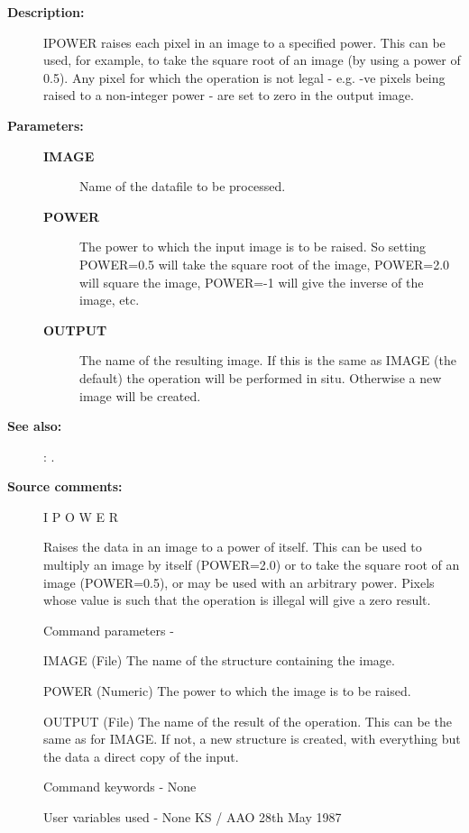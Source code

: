\begin{description}
\begin{description}
\item [\textbf{Description:}]
 IPOWER raises each pixel in an image to a specified power.  This
 can be used, for example, to take the square root of an image (by
 using a power of 0.5).  Any pixel for which the operation is not
 legal - e.g. -ve pixels being raised to a non-integer power - are
 set to zero in the output image.

\item [\textbf{Parameters:}]
\begin{description}
\item [\textbf{IMAGE}]
 Name of the datafile to be processed.
\item [\textbf{POWER}]
 The power to which the input image is to be
 raised.  So setting POWER=0.5 will take the square root
 of the image, POWER=2.0 will square the image, POWER=-1
 will give the inverse of the image, etc.
\item [\textbf{OUTPUT}]
 The name of the resulting image.  If this is the
 same as IMAGE (the default) the operation will be
 performed in situ.  Otherwise a new image will be
 created.
\end{description}

\item [\textbf{See also:}]
: .\\

\item [\textbf{Source comments:}]
\begin{terminalv}
 I P O W E R

 Raises the data in an image to a power of itself.  This can be used
 to multiply an image by itself (POWER=2.0) or to take the square
 root of an image (POWER=0.5), or may be used with an arbitrary power.
 Pixels whose value is such that the operation is illegal will give
 a zero result.

 Command parameters -

 IMAGE  (File) The name of the structure containing the image.

 POWER  (Numeric) The power to which the image is to be raised.

 OUTPUT (File) The name of the result of the operation.  This can
        be the same as for IMAGE.  If not, a new structure
        is created, with everything but the data a direct
        copy of the input.

 Command keywords  - None

 User variables used - None
                                  KS / AAO 28th May 1987
\end{terminalv}
\end{description}

\end{description}
